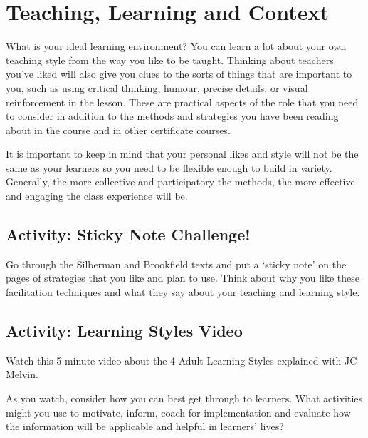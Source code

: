 \documentclass[
]{book}
\begin{document}
\hypertarget{teaching-learning-and-context}{%
\section{Teaching, Learning and Context}\label{teaching-learning-and-context}}

What is your ideal learning environment? You can learn a lot about your own teaching style from the way you like to be taught. Thinking about teachers you've liked will also give you clues to the sorts of things that are important to you, such as using critical thinking, humour, precise details, or visual reinforcement in the lesson. These are practical aspects of the role that you need to consider in addition to the methods and strategies you have been reading about in the course and in other certificate courses.

It is important to keep in mind that your personal likes and style will not be the same as your learners so you need to be flexible enough to build in variety. Generally, the more collective and participatory the methods, the more effective and engaging the class experience will be.

\hypertarget{activity-sticky-note-challenge}{%
\subsection{Activity: Sticky Note Challenge!}\label{activity-sticky-note-challenge}}

\begin{reflect}
Go through the Silberman and Brookfield texts and put a `sticky note' on
the pages of strategies that you like and plan to use. Think about why
you like these facilitation techniques and what they say about your
teaching and learning style.
\end{reflect}

\hypertarget{activity-learning-styles-video}{%
\subsection{Activity: Learning Styles Video}\label{activity-learning-styles-video}}

\begin{reflect}
Watch this 5 minute video about the 4 Adult Learning Styles explained
with JC Melvin.

As you watch, consider how you can best get through to learners. What
activities might you use to motivate, inform, coach for implementation
and evaluate how the information will be applicable and helpful in
learners' lives?
\end{reflect}
\end{document}
